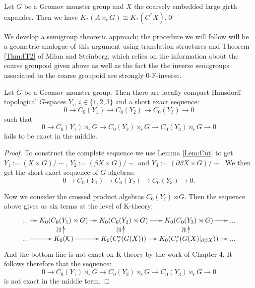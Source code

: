 \begin{example}
\begin{proposition}
Let $G$ be a Gromov monster group and $X$ the coarsely embedded large girth expander. Then we have $K_{*}(A\rtimes_{r} G) \cong K_{*}(C^{*}X)$.\qed
\end{proposition}

We develop a semigroup theoretic approach; the procedure we will follow will be a geometric analogue of this argument using translation structures and Theorem \ref{Thm:IT2} of Milan and Steinberg, which relies on the information about the coarse groupoid given above as well as the fact the the inverse semigroups associated to the coarse groupoid are strongly 0-F-inverse.

\begin{theorem}\label{Thm:GM1}
Let $G$ be a Gromov monster group. Then there are locally compact Hausdorff topological $G$-spaces $Y_{i}$, $i \in \lbrace 1,2,3 \rbrace$ and a short exact sequence:
\begin{equation*}
0 \rightarrow C_{0}(Y_{1}) \rightarrow C_{0}(Y_{2}) \rightarrow C_{0}(Y_{3}) \rightarrow 0
\end{equation*}
such that
\begin{equation*}
0 \rightarrow C_{0}(Y_{1})\rtimes_{r} G \rightarrow C_{0}(Y_{2})\rtimes_{r} G \rightarrow C_{0}(Y_{3})\rtimes_{r} G \rightarrow 0
\end{equation*}
fails to be exact in the middle.
\end{theorem}
\begin{proof}
To construct the complete sequence we use Lemma \ref{Lem:Cut} to get $Y_{1}:= (X \times G)/\sim$, $Y_{2}:= (\beta X \times G)/\sim$ and $Y_{3}:= (\partial\beta X \times G)/\sim$. We then get the short exact sequence of $G$-algebras:
\begin{equation*}
0 \rightarrow C_{0}(Y_{1}) \rightarrow C_{0}(Y_{2}) \rightarrow C_{0}(Y_{3}) \rightarrow 0.
\end{equation*}

Now we consider the crossed product algebras $C_{0}(Y_{i})\rtimes G$. Then the sequence above gives us six terms at the level of K-theory: 
\begin{equation*}
\xymatrix@=1em{...\ar[r] & K_{0}(C_{0}(Y_{1})\rtimes G) \ar[r]& K_{0}(C_{0}(Y_{2})\rtimes G) \ar[r]& K_{0}(C_{0}(Y_{3})\rtimes G)\ar[r] & ...\\
...\ar[r] & K_{0}(\mathcal{K}) \ar[r]\ar[u]^{\ucong}& K_{0}(C^{*}_{r}(G(X))) \ar[r]\ar[u]^{\ucong}& K_{0}(C^{*}_{r}(G(X)|_{\partial\beta X})) \ar[r]\ar[u]^{\ucong}& ...}
\end{equation*}
And the bottom line is not exact on K-theory by the work of Chapter 4. It follows therefore that the sequence:
\begin{equation*}
0 \rightarrow C_{0}(Y_{1})\rtimes_{r} G \rightarrow C_{0}(Y_{2})\rtimes_{r} G \rightarrow C_{0}(Y_{3})\rtimes_{r} G \rightarrow 0
\end{equation*}
is not exact in the middle term.
\end{proof}


\end{example}
